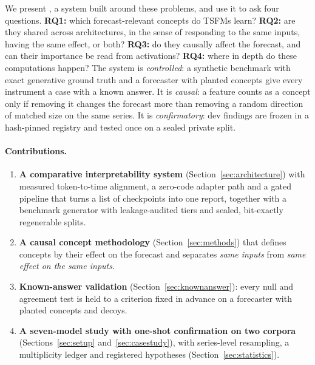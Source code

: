 We present \tool{}, a system built around these problems, and use it to ask four questions. \textbf{RQ1:} which
forecast-relevant concepts do TSFMs learn? \textbf{RQ2:} are they shared across architectures, in the sense of
responding to the same inputs, having the same effect, or both? \textbf{RQ3:} do they causally affect the forecast, and
can their importance be read from activations? \textbf{RQ4:} where in depth do these computations happen? The system is
\emph{controlled}: a synthetic benchmark with exact generative ground truth and a forecaster with planted concepts give
every instrument a case with a known answer. It is \emph{causal}: a feature counts as a concept only if removing it
changes the forecast more than removing a random direction of matched size on the same series. It is
\emph{confirmatory}: dev findings are frozen in a hash-pinned registry and tested once on a sealed private split.

\paragraph{Contributions.}
\begin{enumerate}[label=\textbf{C\arabic*.},leftmargin=2.2em]
  \item \textbf{A comparative interpretability system} (Section~\ref{sec:architecture}) with measured token-to-time
    alignment, a zero-code adapter path and a gated pipeline that turns a list of checkpoints into one report, together
    with a benchmark generator with leakage-audited tiers and sealed, bit-exactly regenerable splits.
  \item \textbf{A causal concept methodology} (Section~\ref{sec:methods}) that defines concepts by their effect on the
    forecast and separates \emph{same inputs} from \emph{same effect on the same inputs}.
  \item \textbf{Known-answer validation} (Section~\ref{sec:knownanswer}): every null and agreement test is held to a
    criterion fixed in advance on a forecaster with planted concepts and decoys.
  \item \textbf{A seven-model study with one-shot confirmation on two corpora} (Sections~\ref{sec:setup}
    and~\ref{sec:casestudy}), with series-level resampling, a multiplicity ledger and registered hypotheses
    (Section~\ref{sec:statistics}).
\end{enumerate}

